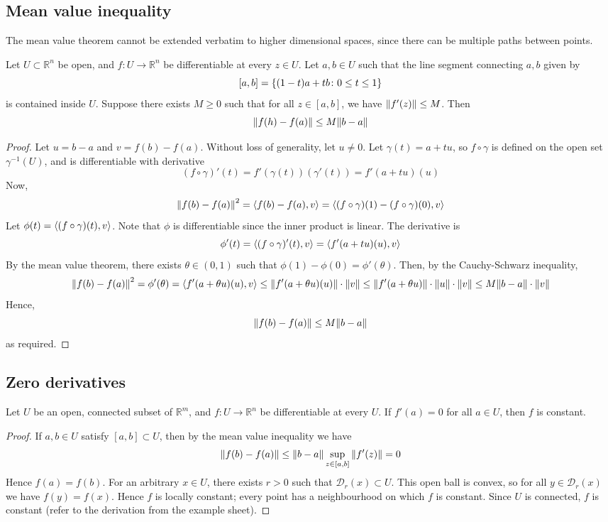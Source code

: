 \subsection{Mean value inequality}
The mean value theorem cannot be extended verbatim to higher dimensional spaces, since there can be multiple paths between points.
\begin{theorem}
	Let \( U \subset \mathbb R^n \) be open, and \( f \colon U \to \mathbb R^n \) be differentiable at every \( z \in U \).
	Let \( a, b \in U \) such that the line segment connecting \( a,b \) given by
	\[
		[a,b] = \qty{(1-t)a + tb \colon 0 \leq t \leq 1}
	\]
	is contained inside \( U \).
	Suppose there exists \( M \geq 0 \) such that for all \( z \in [a,b] \), we have \( \norm{f'(z)} \leq M \).
	Then
	\[
		\norm{f(h) - f(a)} \leq M \norm{b-a}
	\]
\end{theorem}
\begin{proof}
	Let \( u = b - a \) and \( v = f(b) - f(a) \).
	Without loss of generality, let \( u \neq 0 \).
	Let \( \gamma(t) = a + tu \), so \( f \circ \gamma \) is defined on the open set \( \gamma^{-1}(U) \), and is differentiable with derivative
	\[
		(f \circ \gamma)'(t) = f'(\gamma(t))(\gamma'(t)) = f'(a+tu)(u)
	\]
	Now,
	\[
		\norm{f(b) - f(a)}^2 = \left\langle{f(b) - f(a), v}\right\rangle = \left\langle{(f \circ \gamma)(1) - (f \circ \gamma)(0), v}\right\rangle
	\]
	Let \( \phi(t) = \left\langle{(f \circ \gamma)(t), v}\right\rangle \).
	Note that \( \phi \) is differentiable since the inner product is linear.
	The derivative is
	\[
		\phi'(t) = \left\langle{(f \circ \gamma)'(t), v}\right\rangle = \left\langle{f'(a+tu)(u), v}\right\rangle
	\]
	By the mean value theorem, there exists \( \theta \in (0,1) \) such that \( \phi(1) - \phi(0) = \phi'(\theta) \).
	Then, by the Cauchy-Schwarz inequality,
	\[
		\norm{f(b) - f(a)}^2 = \phi'(\theta) = \left\langle{f'(a+\theta u)(u), v}\right\rangle \leq \norm{f'(a+\theta u)(u)} \cdot \norm{v} \leq \norm{f'(a+\theta u)} \cdot \norm{u} \cdot \norm{v} \leq M \norm{b-a} \cdot \norm{v}
	\]
	Hence,
	\[
		\norm{f(b) - f(a)} \leq M \norm{b-a}
	\]
	as required.
\end{proof}

\subsection{Zero derivatives}
\begin{corollary}
	Let \( U \) be an open, connected subset of \( \mathbb R^m \), and \( f \colon U \to \mathbb R^n \) be differentiable at every \( U \).
	If \( f'(a) = 0 \) for all \( a \in U \), then \( f \) is constant.
\end{corollary}
\begin{proof}
	If \( a, b \in U \) satisfy \( [a,b] \subset U \), then by the mean value inequality we have
	\[
		\norm{f(b) - f(a)} \leq \norm{b-a} \sup_{z \in [a,b]} \norm{f'(z)} = 0
	\]
	Hence \( f(a) = f(b) \).
	For an arbitrary \( x \in U \), there exists \( r > 0 \) such that \( \mathcal D_r(x) \subset U \).
	This open ball is convex, so for all \( y \in \mathcal D_r(x) \) we have \( f(y) = f(x) \).
	Hence \( f \) is locally constant; every point has a neighbourhood on which \( f \) is constant.
	Since \( U \) is connected, \( f \) is constant (refer to the derivation from the example sheet).
\end{proof}

